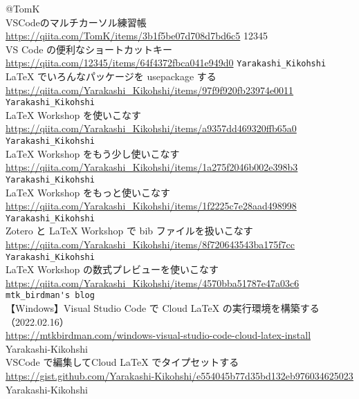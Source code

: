 \documentclass{ltjsarticle}
\begin{document}
\begin{thebibliography}{999}
  @TomK\\
  VSCodeのマルチカーソル練習帳\\
  \url{https://qiita.com/TomK/items/3b1f5be07d708d7bd6c5}
  12345\\
  VS Code の便利なショートカットキー\\
  \url{https://qiita.com/12345/items/64f4372fbca041e949d0}
  \verb|Yarakashi_Kikohshi|\\
  LaTeX でいろんなパッケージを usepackage する\\
  \url{https://qiita.com/Yarakashi_Kikohshi/items/97f9f920fb23974e0011}
  \verb|Yarakashi_Kikohshi|\\
  LaTeX Workshop を使いこなす\\
  \url{https://qiita.com/Yarakashi_Kikohshi/items/a9357dd469320ffb65a0}
  \verb|Yarakashi_Kikohshi|\\
  LaTeX Workshop をもう少し使いこなす\\
  \url{https://qiita.com/Yarakashi_Kikohshi/items/1a275f2046b002e398b3}
  \verb|Yarakashi_Kikohshi|\\
  LaTeX Workshop をもっと使いこなす\\
  \url{https://qiita.com/Yarakashi_Kikohshi/items/1f2225c7e28aad498998}
  \verb|Yarakashi_Kikohshi|\\
  Zotero と LaTeX Workshop で bib ファイルを扱いこなす\\
  \url{https://qiita.com/Yarakashi_Kikohshi/items/8f720643543ba175f7cc}
  \verb|Yarakashi_Kikohshi|\\
  LaTeX Workshop の数式プレビューを使いこなす\\
  \url{https://qiita.com/Yarakashi_Kikohshi/items/4570bba51787e47a03c6}
  \verb|mtk_birdman's blog|\\
  【Windows】Visual Studio Code で Cloud LaTeX の実行環境を構築する（2022.02.16）\\
  \url{https://mtkbirdman.com/windows-visual-studio-code-cloud-latex-install}
  Yarakashi-Kikohshi\\
  VSCode で編集してCloud LaTeX でタイプセットする\\
  \url{https://gist.github.com/Yarakashi-Kikohshi/e554045b77d35bd132eb976034625023}
  Yarakashi-Kikohshi\\

\end{thebibliography}
\end{document}
